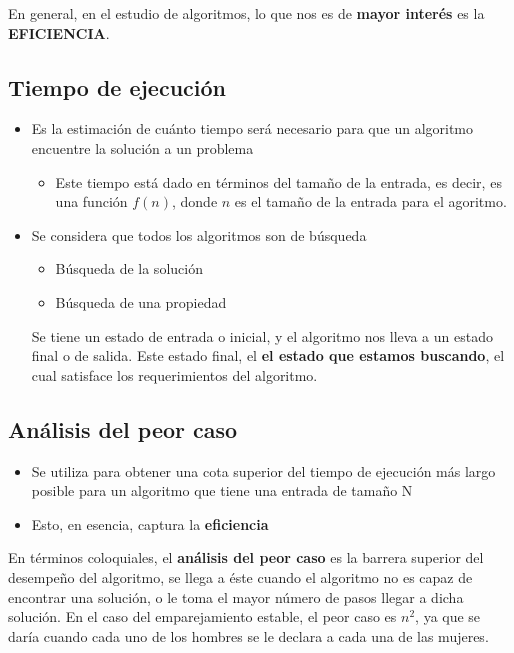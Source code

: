 \documentclass[letterpaper]{article}
\begin{document}
En general, en el estudio de algoritmos, lo que nos es de \textbf{mayor interés} es la
\textbf{EFICIENCIA}.
\subsection{Tiempo de ejecución}
\label{sec:orge7fa638}
\begin{itemize}
\item Es la estimación de cuánto tiempo será necesario para que un algoritmo
encuentre la solución a un problema
\begin{itemize}
\item Este tiempo está dado en términos del tamaño de la entrada, es decir, es
una función \(f(n)\), donde \(n\) es el tamaño de la entrada para el agoritmo.
\end{itemize}
\item Se considera que todos los algoritmos son de búsqueda
\begin{itemize}
\item Búsqueda de la solución
\item Búsqueda de una propiedad
\end{itemize}
Se tiene un estado de entrada o inicial, y el algoritmo nos lleva a un estado
final o de salida. Este estado final, el \textbf{el estado que estamos buscando}, el
cual satisface los requerimientos del algoritmo.
\end{itemize}
\subsection{Análisis del peor caso}
\label{sec:orgc55849d}
\begin{itemize}
\item Se utiliza para obtener una cota superior del tiempo de ejecución más largo
posible para un algoritmo que tiene una entrada de tamaño N
\item Esto, en esencia, captura la \textbf{eficiencia}
\end{itemize}

En términos coloquiales, el \textbf{análisis del peor caso} es la barrera superior del
desempeño del algoritmo, se llega a éste cuando el algoritmo no es capaz de
encontrar una solución, o le toma el mayor número de pasos llegar a dicha
solución. En el caso del emparejamiento estable, el peor caso es \(n^2\), ya que
se daría cuando cada uno de los hombres se le declara a cada una de las
mujeres.
\end{document}
